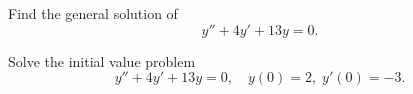 \setcounter{example}{2}
\setcounter{equation}{13}
\begin{example}
  \label{example:5.2.3}\rm \mbox{}
  \newline
  \begin{alist}
    \item %
    Find the general solution of
    \begin{equation}
      \label{eq:5.2.14}y''+4y'+13y=0.
    \end{equation}

    \item %
    Solve the initial value problem
    \begin{equation}
      \label{eq:5.2.15}y''+4y'+13y=0,\quad y(0)=2,\;y'(0)=-3.
    \end{equation}
  \end{alist}
\end{example}
\setcounter{equation}{15}
\setcounter{figure}{2}
